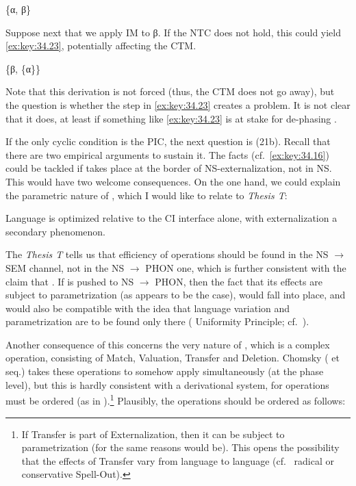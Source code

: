 \documentclass[output=paper]{langsci/langscibook}
\begin{document}
\ea%
    \label{ex:key:34.22}
    \{α, β\}
\z

Suppose next that we apply \gls{IM} to β. If the \gls{NTC} does not hold, this
could yield \eqref{ex:key:34.23}, potentially affecting the \gls{CTM}.

\ea%
    \label{ex:key:34.23}
    \{β, \{α\}\}
\z

Note that this derivation is not forced (thus, the \gls{CTM} does not go away),
but the question is whether the step in \eqref{ex:key:34.23} creates a problem. It is not clear
that it does, at least if something like \eqref{ex:key:34.23} is at stake for de-phasing
\parencite[cf.][]{Chomsky2015}.

If the only cyclic condition is the \gls{PIC}, the next question is (21b).
Recall that there are two empirical arguments to sustain it. The 
facts (cf.~\eqref{ex:key:34.16}) could be tackled if  takes place at the border of
\gls{NS}-externalization, not in \gls{NS}. This would have two welcome
consequences. On the one hand, we could explain the parametric nature of ,
which I would like to relate to  \emph{Thesis T}:

\ea%
    \label{ex:key:34.24}
    Language is optimized relative to the \gls{CI} interface alone, with
    externalization a secondary phenomenon. \parencite[7]{Chomsky2014}
\z

The \emph{Thesis T} tells us that efficiency of operations should be found in
the \gls{NS} $\rightarrow$ SEM channel, not in the \gls{NS} $\rightarrow$ PHON
one, which is further consistent with the claim that
. If  is pushed to NS ${\rightarrow}$
PHON, then the fact that its effects are subject to parametrization (as appears
to be the case), would fall into place, and would also be compatible with the
idea that language variation and parametrization are to be found only there
( Uniformity Principle;
cf.~\citealt{Chomsky2010,BerCho2011}).

Another consequence of this concerns the very nature of , which is a
complex operation, consisting of Match, Valuation, Transfer and Deletion.
Chomsky (\citeyear{Chomsky2004} et seq.) takes these operations to somehow apply simultaneously
(at the phase level), but this is hardly consistent with a derivational system,
for operations must be ordered (as in \citealt{Chomsky2015}).\footnote{If
    Transfer is part of Externalization, then it can be subject to
    parametrization (for the same reasons  would be). This opens the
possibility that the effects of Transfer vary from language to language
(cf.~ radical or conservative Spell-Out).}
Plausibly, the operations should be ordered as follows:
\end{document}
